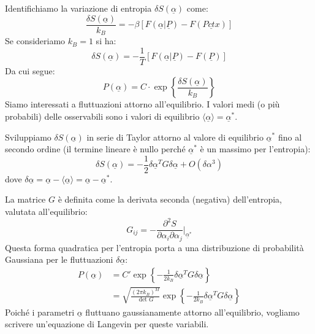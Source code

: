 Identifichiamo la variazione di entropia $\delta S(\underline{\alpha})$ come:
\begin{equation}
\frac{\delta S(\underline{\alpha})}{k_B} = -\beta[F(\underline{\alpha}|\underline{P})-F(\underline{Pctx})]
\end{equation}
Se consideriamo $k_B =1$ si ha:
\begin{equation}
\delta S(\underline{\alpha})= -\frac{1}{T}[F(\underline{\alpha}|\underline{P})-F(\underline{P})]
\end{equation}
Da cui segue:
\begin{equation}
P(\underline{\alpha})=C \cdot \exp\left\{\frac{\delta S(\underline{\alpha})}{k_{B}}\right\}
\end{equation}
Siamo interessati a fluttuazioni attorno all'equilibrio. I valori medi (o più probabili) delle osservabili sono i valori di equilibrio $\langle\underline{\alpha}\rangle=\underline{\alpha}^{*}$.

Sviluppiamo $\delta S(\underline{\alpha})$ in serie di Taylor attorno al valore di equilibrio $\underline{\alpha}^{*}$ fino al secondo ordine (il termine lineare è nullo perché $\underline{\alpha}^{*}$ è un massimo per l'entropia):
\begin{equation}
\delta S(\underline{\alpha})=-\frac{1}{2}\delta\underline{\alpha}^{T}G\delta\underline{\alpha}+O(\delta\alpha^{3})
\end{equation}
dove $\delta\underline{\alpha}=\underline{\alpha}-\langle\underline{\alpha}\rangle=\underline{\alpha}-\underline{\alpha}^{*}$.

La matrice $G$ è definita come la derivata seconda (negativa) dell'entropia, valutata all'equilibrio:
\begin{equation}
G_{ij}=-\frac{\partial^{2}S}{\partial\alpha_{i}\partial\alpha_{j}}\Bigg|_{\underline{\alpha}^{*}}
\end{equation}
Questa forma quadratica per l'entropia porta a una distribuzione di probabilità Gaussiana per le fluttuazioni $\delta\underline{\alpha}$:
\begin{align}
P(\underline{\alpha}) &= C' \exp\left\{-\frac{1}{2k_{B}}\delta\underline{\alpha}^{T}G\delta\underline{\alpha}\right\} \nonumber  \\
&= \sqrt{\frac{(2\pi k_B)^M}{\det G}}\exp\left\{-\frac{1}{2k_{B}}\delta\underline{\alpha}^{T}G\delta\underline{\alpha}\right\}
\end{align}
Poiché i parametri $\underline{\alpha}$ fluttuano gaussianamente attorno all'equilibrio, vogliamo scrivere un'equazione di Langevin per queste variabili.

